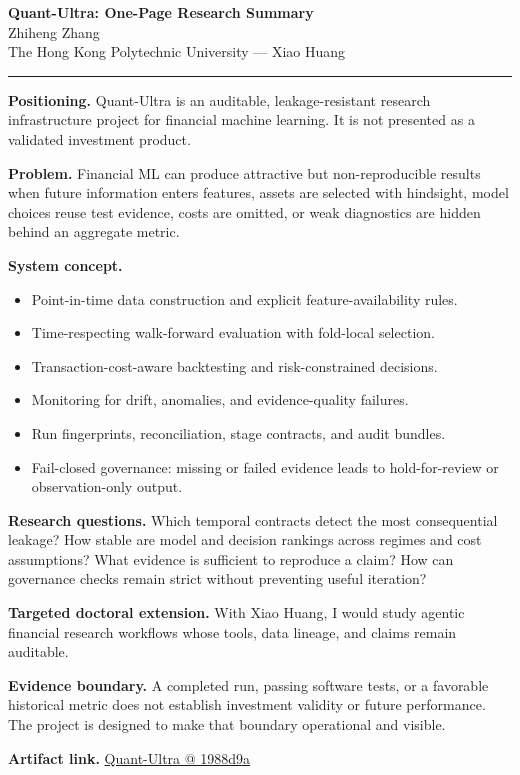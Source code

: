 \documentclass[11pt]{article}
\makeatletter
\newcommand{\ApplicantName}{Zhiheng Zhang}
\newcommand{\ApplicantGitHub}{\href{https://github.com/zhiheng-zhang-Mera/Quant-Ultra/tree/1988d9a8530da91a8158de864d098ea869098923}{Quant-Ultra @ 1988d9a}}
\makeatother
\begin{document}
\begin{center}
{\LARGE\bfseries Quant-Ultra: One-Page Research Summary}\\[0.25em]
{\large \ApplicantName}\\
The Hong Kong Polytechnic University --- Xiao Huang
\end{center}
\vspace{0.35em}\hrule\vspace{0.65em}

\textbf{Positioning.} Quant-Ultra is an auditable, leakage-resistant research infrastructure project for financial machine learning. It is not presented as a validated investment product.

\textbf{Problem.} Financial ML can produce attractive but non-reproducible results when future information enters features, assets are selected with hindsight, model choices reuse test evidence, costs are omitted, or weak diagnostics are hidden behind an aggregate metric.

\textbf{System concept.}
\begin{itemize}
\item Point-in-time data construction and explicit feature-availability rules.
\item Time-respecting walk-forward evaluation with fold-local selection.
\item Transaction-cost-aware backtesting and risk-constrained decisions.
\item Monitoring for drift, anomalies, and evidence-quality failures.
\item Run fingerprints, reconciliation, stage contracts, and audit bundles.
\item Fail-closed governance: missing or failed evidence leads to hold-for-review or observation-only output.
\end{itemize}

\textbf{Research questions.} Which temporal contracts detect the most consequential leakage? How stable are model and decision rankings across regimes and cost assumptions? What evidence is sufficient to reproduce a claim? How can governance checks remain strict without preventing useful iteration?

\textbf{Targeted doctoral extension.} With Xiao Huang, I would study agentic financial research workflows whose tools, data lineage, and claims remain auditable.

\textbf{Evidence boundary.} A completed run, passing software tests, or a favorable historical metric does not establish investment validity or future performance. The project is designed to make that boundary operational and visible.

\textbf{Artifact link.} \ApplicantGitHub
\end{document}

